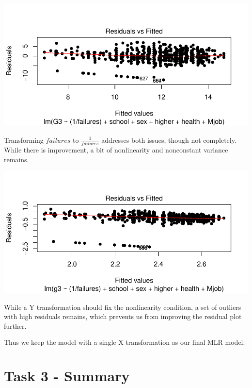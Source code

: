 \documentclass{article}
\begin{document}
\includegraphics{Report_4-021}
\bigskip

Transforming $failures$ to $\frac{1}{failures}$ addresses both issues, though not completely. While there is improvement, a bit of nonlinearity and nonconstant variance remains. 


\includegraphics{Report_4-022}
\bigskip

While a Y transformation should fix the nonlinearity condition, a set of outliers with high residuals remains, which prevents us from improving the residual plot further.

Thus we keep the model with a single X transformation as our final MLR model.

\section{Task 3 - Summary}
\end{document}
